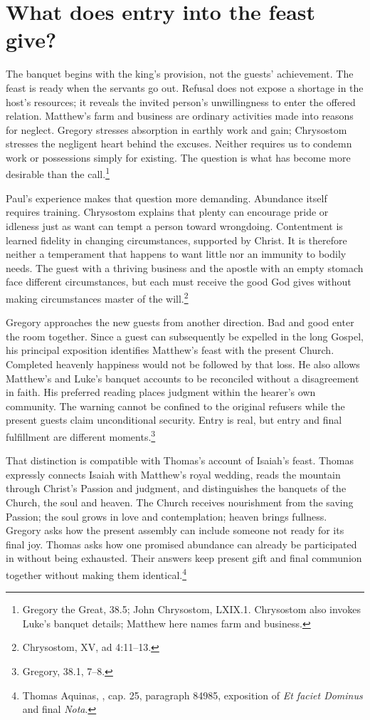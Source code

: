 \section{What does entry into the feast give?}
The banquet begins with the king's provision, not the guests' achievement. The feast is ready when the servants go out. Refusal does not expose a shortage in the host's resources; it reveals the invited person's unwillingness to enter the offered relation. Matthew's farm and business are ordinary activities made into reasons for neglect. Gregory stresses absorption in earthly work and gain; Chrysostom stresses the negligent heart behind the excuses. Neither requires us to condemn work or possessions simply for existing. The question is what has become more desirable than the call.\footnote{Gregory the Great,  38.5; John Chrysostom,  LXIX.1. Chrysostom also invokes Luke's banquet details; Matthew here names farm and business.}

Paul's experience makes that question more demanding. Abundance itself requires training. Chrysostom explains that plenty can encourage pride or idleness just as want can tempt a person toward wrongdoing. Contentment is learned fidelity in changing circumstances, supported by Christ. It is therefore neither a temperament that happens to want little nor an immunity to bodily needs. The guest with a thriving business and the apostle with an empty stomach face different circumstances, but each must receive the good God gives without making circumstances master of the will.\footnote{Chrysostom,  XV, ad 4:11--13.}

Gregory approaches the new guests from another direction. Bad and good enter the room together. Since a guest can subsequently be expelled in the long Gospel, his principal exposition identifies Matthew's feast with the present Church. Completed heavenly happiness would not be followed by that loss. He also allows Matthew's and Luke's banquet accounts to be reconciled without a disagreement in faith. His preferred reading places judgment within the hearer's own community. The warning cannot be confined to the original refusers while the present guests claim unconditional security. Entry is real, but entry and final fulfillment are different moments.\footnote{Gregory,  38.1, 7--8.}

That distinction is compatible with Thomas's account of Isaiah's feast. Thomas expressly connects Isaiah with Matthew's royal wedding, reads the mountain through Christ's Passion and judgment, and distinguishes the banquets of the Church, the soul and heaven. The Church receives nourishment from the saving Passion; the soul grows in love and contemplation; heaven brings fullness. Gregory asks how the present assembly can include someone not ready for its final joy. Thomas asks how one promised abundance can already be participated in without being exhausted. Their answers keep present gift and final communion together without making them identical.\footnote{Thomas Aquinas, , cap. 25, paragraph 84985, exposition of \textit{Et faciet Dominus} and final \textit{Nota}.}

